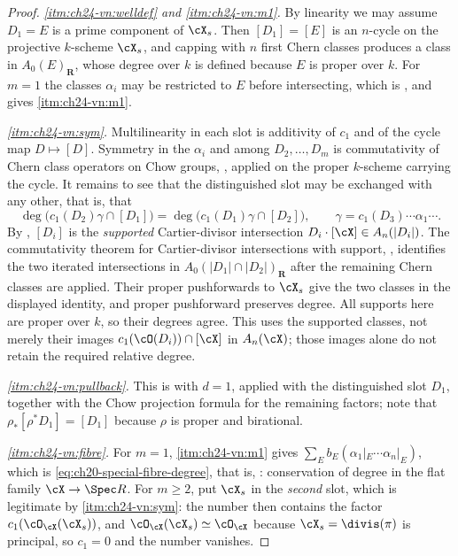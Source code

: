 \begin{proof}
\emph{\cref{itm:ch24-vn:welldef} and \cref{itm:ch24-vn:m1}.}  By linearity we
may assume $D_1=E$ is a prime component of $\cX_s$.  Then
$[D_1]=[E]$ is an $n$-cycle on the projective $k$-scheme $\cX_s$, and
capping with $n$ first Chern classes produces a class in
$A_0(E)_{\mathbf R}$, whose degree over $k$ is defined because $E$ is
proper over $k$.  For $m=1$ the classes $\alpha_i$ may be restricted to
$E$ before intersecting, which is ,
and gives \cref{itm:ch24-vn:m1}.

\emph{\cref{itm:ch24-vn:sym}.}  Multilinearity in each slot is additivity of
$c_1$ and of the cycle map $D\mapsto[D]$.  Symmetry in the
$\alpha_i$ and among $D_2,\ldots,D_m$ is commutativity of Chern class
operators on Chow groups, , applied on the
proper $k$-scheme carrying the cycle.  It remains to see that the
distinguished slot may be exchanged with any other, that is, that
\[
 \deg\bigl(c_1(D_2)\gamma\cap[D_1]\bigr)
 =\deg\bigl(c_1(D_1)\gamma\cap[D_2]\bigr),
 \qquad
 \gamma=c_1(D_3)\cdots\alpha_1\cdots .
\]
By , $[D_i]$ is the
\emph{supported} Cartier-divisor intersection
$D_i\mathbin{\cdot}[\cX]\in A_n(|D_i|)$.
The commutativity theorem for Cartier-divisor intersections with support,
\cite[Theorem~2.4]{Ful}, identifies the two iterated intersections in
$A_0(|D_1|\cap|D_2|)_{\mathbf R}$ after the remaining Chern classes
are applied.  Their proper pushforwards to $\cX_s$ give the two classes
in the displayed identity, and proper pushforward preserves degree.
All supports here are proper over $k$, so their degrees agree.
This uses the supported classes, not merely their images
$c_1(\cO(D_i))\cap[\cX]$ in $A_n(\cX)$; those images alone do not
retain the required relative degree.

\emph{\cref{itm:ch24-vn:pullback}.}  This is
 with $d=1$, applied with the
distinguished slot $D_1$, together with the Chow projection formula
 for the remaining factors; note that
$\rho_*[\rho^*D_1]=[D_1]$ because $\rho$ is proper and birational.

\emph{\cref{itm:ch24-vn:fibre}.}  For $m=1$, \cref{itm:ch24-vn:m1} gives
$\sum_Eb_E(\alpha_1|_E\cdots\alpha_n|_E)$, which is
\eqref{eq:ch20-special-fibre-degree}, that is,
: conservation of degree in the flat family
$\cX\to\Spec R$.  For $m\geq2$, put $\cX_s$ in the \emph{second} slot,
which is legitimate by \cref{itm:ch24-vn:sym}: the number then contains the
factor $c_1(\cO_{\cX}(\cX_s))$, and $\cO_{\cX}(\cX_s)\simeq\cO_{\cX}$
because $\cX_s=\divis(\pi)$ is principal, so $c_1=0$ and the number
vanishes.
\end{proof}

